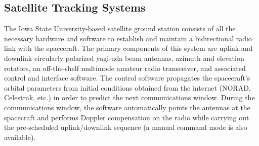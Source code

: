 \documentclass[nocover]            %
{CSLI}                       %
\begin{document}
\subsection{Satellite Tracking Systems}
The Iowa State University-based satellite ground station consists of all the necessary hardware and software to establish and maintain a bidirectional radio link with the spacecraft. The primary components of this system are uplink and downlink circularly polarized yagi-uda beam antennas, azimuth and elevation rotators, an off-the-shelf multimode amateur radio transceiver, and associated control and interface software. The control software propagates the spacecraft's orbital parameters from initial conditions obtained from the internet (NORAD, Celestrak, etc.) in order to predict the next communications window. During the communications window, the software automatically points the antennas at the spacecraft and performs Doppler compensation on the radio while carrying out the pre-scheduled uplink/downlink sequence (a manual command mode is also available).
\end{document}
